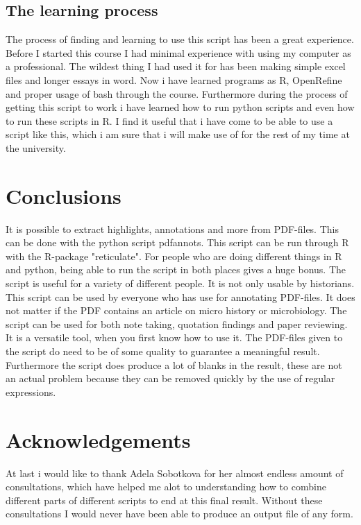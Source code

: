 \documentclass{article}
\begin{document}
\subsection{The learning process}
The process of finding and learning to use this script has been a great experience. Before I started this course I had minimal experience with using my computer as a professional. The wildest thing I had used it for has been making simple excel files and longer essays in word. Now i have learned programs as R, OpenRefine and proper usage of bash through the course. Furthermore during the process of getting this script to work i have learned how to run python scripts and even how to run these scripts in R. I find it useful that i have come to be able to use a script like this, which i am sure that i will make use of for the rest of my time at the university.

\section{Conclusions}
It is possible to extract highlights, annotations and more from PDF-files. This can be done with the python script pdfannots. This script can be run through R with the R-package "reticulate". For people who are doing different things in R and python, being able to run the script in both places gives a huge bonus. The script is useful for a variety of different people. It is not only usable by historians. This script can be used by everyone who has use for annotating PDF-files. It does not matter if the PDF contains an article on micro history or microbiology. The script can be used for both note taking, quotation findings and paper reviewing. It is a versatile tool, when you first know how to use it. The PDF-files given to the script do need to be of some quality to guarantee a meaningful result. Furthermore the script does produce a lot of blanks in the result, these are not an actual problem because they can be removed quickly by the use of regular expressions. 

\section{Acknowledgements}
At last i would like to thank Adela Sobotkova for her almost endless amount of consultations, which have helped me alot to understanding how to combine different parts of different scripts to end at this final result. Without these consultations I would never have been able to  produce an output file of any form. 
\newpage
\end{document}
